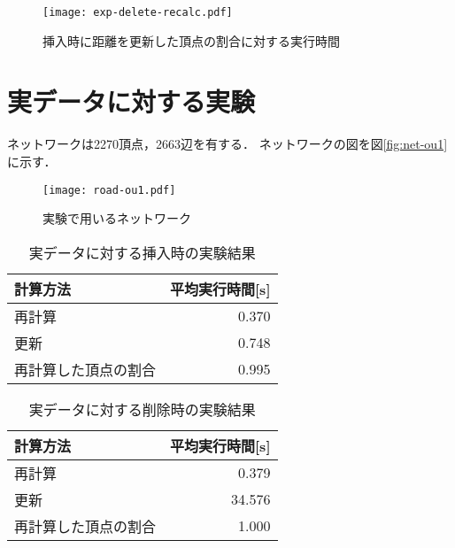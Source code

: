 \begin{figure}[tb]
  \centering
  \texttt{[image: exp-delete-recalc.pdf]}
  \caption{挿入時に距離を更新した頂点の割合に対する実行時間}
  \label{fig:exp-delete-recalc}
\end{figure}

\section{実データに対する実験}

ネットワークは2270頂点，2663辺を有する．
ネットワークの図を図\ref{fig:net-ou1}に示す．

\begin{figure}[tb]
  \centering
  \texttt{[image: road-ou1.pdf]}
  \caption{実験で用いるネットワーク}
\end{figure}

\begin{table}[tb]
  \centering
  \caption{実データに対する挿入時の実験結果}
  \begin{tabular}{lr}
    \hline
    計算方法 & 平均実行時間[s] \\ \hline
    再計算 & 0.370 \\ \hline
    更新 & 0.748 \\ \hline\hline
    再計算した頂点の割合 & 0.995 \\ \hline
  \end{tabular}
\end{table}

\begin{table}[tb]
  \centering
  \caption{実データに対する削除時の実験結果}
  \begin{tabular}{lr}
    \hline
    計算方法 & 平均実行時間[s] \\ \hline
    再計算 & 0.379 \\ \hline
    更新 & 34.576 \\ \hline\hline
    再計算した頂点の割合 & 1.000 \\ \hline
  \end{tabular}
\end{table}
